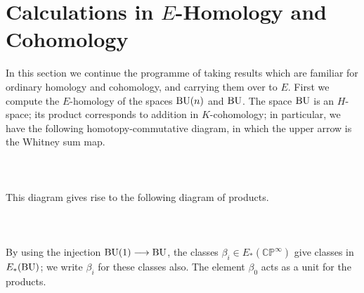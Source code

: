 \documentclass[../main]{subfiles}
\begin{document}
\renewcommand{\labelenumi}{(\roman{enumi})}

\chapter{Calculations in \texorpdfstring{$E$}{E}-Homology and Cohomology}
\label{sec:p2c4}


In this section we continue the programme of taking results which are familiar for ordinary homology and cohomology, and carrying them over to $E$. First we compute the $E$-homology of the spaces $\mathrm{BU}(n)$ and $\mathrm{BU}$. The space $\mathrm{BU}$ is an $H$-space; its product corresponds to addition in $K$-cohomology; in particular, we have the following homotopy-commutative diagram, in which the upper arrow is the Whitney sum map.
~\\~\\
~\\~\\
This diagram gives rise to the following diagram of products.
~\\~\\
~\\~\\
By using the injection $\mathrm{BU}(1)\longrightarrow \mathrm{BU}$, the classes $\beta_i\in E_\ast(\mathbb{CP}^\infty)$ give classes in $E_\ast(\mathrm{BU})$; we write $\beta_i$ for these classes also. The element $\beta_0$ acts as a unit for the products.
\end{document}
